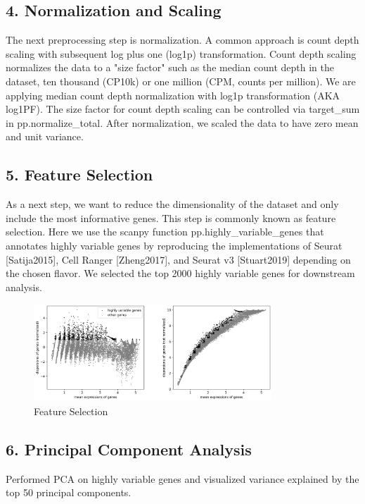 \documentclass[12pt]{article}
\begin{document}
\subsection{4. Normalization and Scaling}
The next preprocessing step is normalization. A common approach is count depth scaling with subsequent log plus one (log1p) transformation. Count depth scaling normalizes the data to a "size factor" such as the median count depth in the dataset, ten thousand (CP10k) or one million (CPM, counts per million). We are applying median count depth normalization with log1p transformation (AKA log1PF). The size factor for count depth scaling can be controlled via target\_sum in pp.normalize\_total. After normalization, we scaled the data to have zero mean and unit variance.

\subsection{5. Feature Selection}
As a next step, we want to reduce the dimensionality of the dataset and only include the most informative genes. This step is commonly known as feature selection. Here we use the scanpy function pp.highly\_variable\_genes that annotates highly variable genes by reproducing the implementations of Seurat [Satija2015], Cell Ranger [Zheng2017], and Seurat v3 [Stuart2019] depending on the chosen flavor. We selected the top 2000 highly variable genes for downstream analysis.

\begin{figure}[H]
    \centering
    \includegraphics[width=0.8\textwidth]{highly_variable_genes.png}
    \caption{Feature Selection}
    \label{fig:highly_variable_genes}
\end{figure}

\subsection{6. Principal Component Analysis}
Performed PCA on highly variable genes and visualized variance explained by the top 50 principal components.
\end{document}
